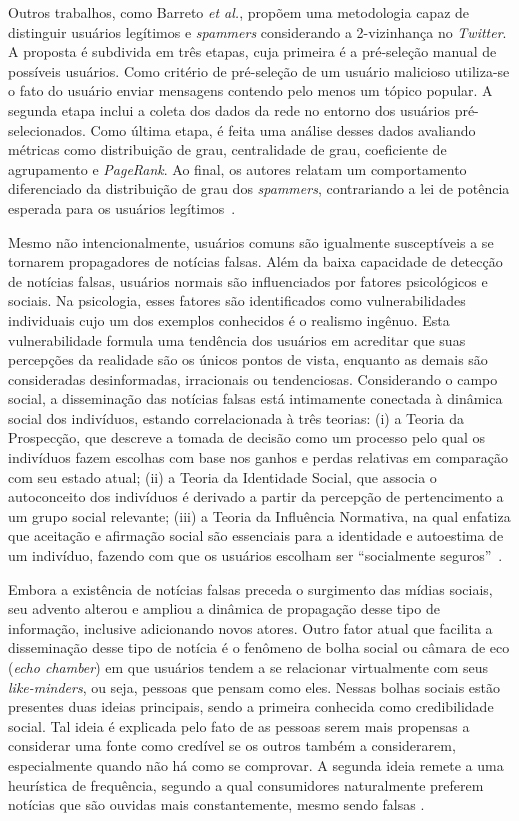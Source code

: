 \documentclass{SBCbookchapter}
\begin{document}
Outros trabalhos, como Barreto {\it et al.}, propõem uma metodologia capaz de distinguir usuários legítimos e \textit{spammers} considerando a 2-vizinhança no \textit{Twitter}. A proposta é subdivida em três etapas, cuja primeira é a pré-seleção manual de possíveis usuários. Como critério de pré-seleção de um usuário malicioso utiliza-se o fato do usuário enviar mensagens contendo pelo menos um tópico popular. A segunda etapa inclui a coleta dos dados da rede no entorno dos usuários pré-selecionados. Como última etapa, é feita uma análise desses dados avaliando métricas como distribuição de grau, centralidade de grau, coeficiente de agrupamento e \textit{PageRank}. Ao final, os autores relatam um comportamento diferenciado da distribuição de grau dos \textit{spammers}, contrariando a lei de potência esperada para os usuários legítimos~\cite{barretospammers}.

Mesmo não intencionalmente, usuários comuns são igualmente susceptíveis a se tornarem propagadores de notícias falsas. Além da baixa capacidade de detecção de notícias falsas, usuários normais são influenciados por fatores psicológicos e sociais. Na psicologia, esses fatores são identificados como vulnerabilidades individuais cujo um dos exemplos conhecidos é o realismo ingênuo. Esta vulnerabilidade formula uma tendência dos usuários em acreditar que suas percepções da realidade são os únicos pontos de vista, enquanto as demais são consideradas desinformadas, irracionais ou tendenciosas. Considerando o campo social, a disseminação das notícias falsas está intimamente conectada à dinâmica social dos indivíduos, estando correlacionada à três teorias: (i) a Teoria da Prospecção, que descreve a tomada de decisão como um processo pelo qual os indivíduos fazem escolhas com base nos ganhos e perdas relativas em comparação com seu estado atual; (ii) a Teoria da Identidade Social, que associa o autoconceito dos indivíduos é derivado a partir da percepção de pertencimento a um grupo social relevante; (iii) a Teoria da Influência Normativa, na qual enfatiza que aceitação e afirmação social são essenciais para a identidade e autoestima de um indivíduo, fazendo com que os usuários escolham ser ``socialmente seguros''~\cite{shu2017fake}.

Embora a existência de notícias falsas preceda o surgimento das mídias sociais, seu advento alterou e ampliou a dinâmica de propagação desse tipo de informação, inclusive adicionando novos atores. Outro fator atual que facilita a disseminação desse tipo de notícia é o fenômeno de bolha social ou câmara de eco (\textit{echo chamber}) em que usuários tendem a se relacionar virtualmente com seus \textit{like-minders}, ou seja, pessoas que pensam como eles. Nessas bolhas sociais estão presentes duas ideias principais, sendo a primeira conhecida como credibilidade social. Tal ideia é explicada pelo fato de as pessoas serem mais propensas a considerar uma fonte como credível se os outros também a considerarem, especialmente quando não há como se comprovar. A segunda ideia remete a uma heurística de frequência, segundo a qual consumidores naturalmente preferem notícias que são ouvidas mais constantemente, mesmo sendo falsas \cite{shu2017fake}.
\end{document}
